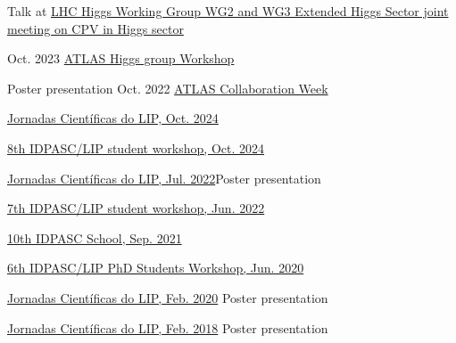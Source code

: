 \begin{cventries}

{}
{}
{}
{
    \begin{cvitems}
    \item Talk at \href{https://indico.cern.ch/event/1230456/\#5-simulation-based-inference-i}{LHC Higgs Working Group WG2 and WG3 Extended Higgs Sector joint meeting on CPV in Higgs sector}
    \end{cvitems}
}\vspace*{2mm}

 
{}
{Oct. 2023}
{\href{https://indico.cern.ch/event/1280531/contributions/5559532/}{ATLAS Higgs group Workshop}}{}\vspace*{2mm}

{Poster presentation}
{Oct. 2022}
{\href{https://indico.cern.ch/event/1187086/\#37-the-atlas-jet-trigger-in-ru}{ATLAS Collaboration Week}}
{}\vspace*{2mm}


{\href{https://indico.lip.pt/event/1744/}{Jornadas Científicas do LIP, Oct. 2024}}{}

{\href{https://indico.lip.pt/event/1745/}{8th IDPASC/LIP student workshop, Oct. 2024}}{}

{\href{https://indico.lip.pt/event/1183/}{Jornadas Científicas do LIP, Jul. 2022}}{Poster presentation}

{\href{https://indico.lip.pt/event/1245/}{7th IDPASC/LIP student workshop, Jun. 2022}}{}

{}{\href{https://indico.lip.pt/event/643}{10th IDPASC School, Sep. 2021}}{}

{}{\href{https://indico.lip.pt/event/699/}{6th IDPASC/LIP PhD Students Workshop, Jun. 2020}}
{}

{}{\href{https://indico.lip.pt/event/650/}{Jornadas Científicas do LIP, Feb. 2020}}
{Poster presentation}

{}{\href{https://indico.lip.pt/event/359/}{Jornadas Científicas do LIP, Feb. 2018}}
{Poster presentation} 

\end{cventries}